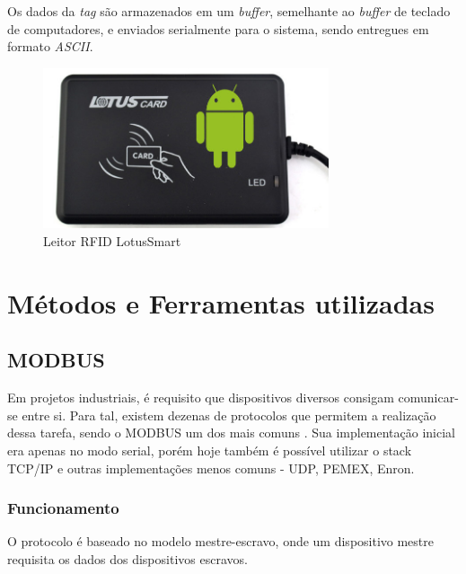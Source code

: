       Os dados da \textit{tag} são armazenados em um \textit{buffer}, semelhante ao \textit{buffer} de teclado de computadores, e enviados serialmente para o sistema, sendo entregues em formato \textit{ASCII}.

      \begin{figure}[H]
        \begin{center}
          \includegraphics[width=0.75\textwidth,natwidth=655,natheight=368]{assets/images/devices-rfid.jpg}
          \caption{Leitor RFID LotusSmart}
          \label{fig:rfid}
        \end{center}
      \end{figure}

  \section{Métodos e Ferramentas utilizadas}
  \label{methodology:tools}

    \subsection{MODBUS}
    \label{methodology:tools:modbus}

      Em projetos industriais, é requisito que dispositivos diversos consigam comunicar-se entre si. Para tal, existem dezenas de protocolos que permitem a realização dessa tarefa, sendo o MODBUS um dos mais comuns \cite{modbus-spec-application}. Sua implementação inicial era apenas no modo serial, porém hoje também é possível utilizar o stack TCP/IP e outras implementações menos comuns - UDP, PEMEX, Enron.

      \subsubsection{Funcionamento}
      \label{methodology:tools:modbus:how}

        O protocolo é baseado no modelo mestre-escravo, onde um dispositivo mestre requisita os dados dos dispositivos escravos.

